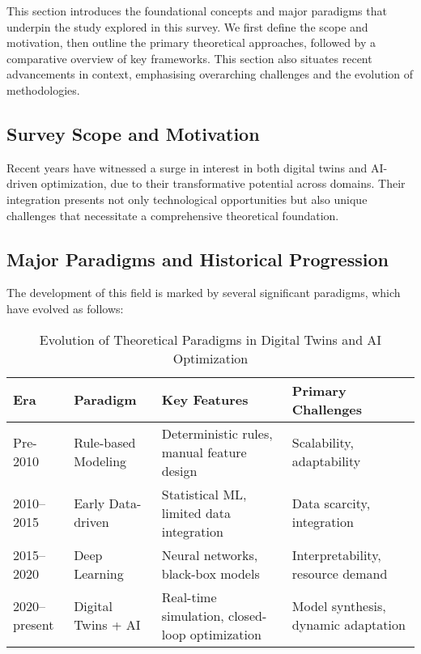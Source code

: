 \documentclass[sigconf]{acmart}
\begin{document}
This section introduces the foundational concepts and major paradigms that underpin the study explored in this survey. We first define the scope and motivation, then outline the primary theoretical approaches, followed by a comparative overview of key frameworks. This section also situates recent advancements in context, emphasising overarching challenges and the evolution of methodologies.

\subsection{Survey Scope and Motivation}
Recent years have witnessed a surge in interest in both digital twins and AI-driven optimization, due to their transformative potential across domains. Their integration presents not only technological opportunities but also unique challenges that necessitate a comprehensive theoretical foundation.

\subsection{Major Paradigms and Historical Progression}
The development of this field is marked by several significant paradigms, which have evolved as follows:

\begin{table*}[htbp]
\centering
\caption{Evolution of Theoretical Paradigms in Digital Twins and AI Optimization}
\label{tab:paradigm-evolution}
\begin{adjustbox}{max width=\textwidth}
\begin{tabular}{@{}llll@{}}
\toprule
Era & Paradigm         & Key Features                                   & Primary Challenges \\
\midrule
Pre-2010      & Rule-based Modeling   & Deterministic rules, manual feature design      & Scalability, adaptability      \\
2010--2015    & Early Data-driven     & Statistical ML, limited data integration       & Data scarcity, integration    \\
2015--2020    & Deep Learning         & Neural networks, black-box models              & Interpretability, resource demand \\
2020--present & Digital Twins + AI    & Real-time simulation, closed-loop optimization & Model synthesis, dynamic adaptation \\
\bottomrule
\end{tabular}
\end{adjustbox}
\end{table*}
\end{document}
